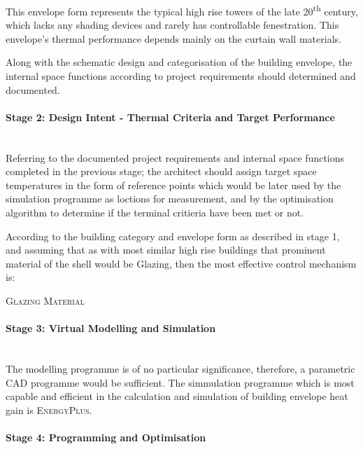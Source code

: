 This envelope form represents the typical high rise towers of the late 20\textsuperscript{th} century, which lacks any shading devices and rarely has controllable fenestration. This envelope's thermal performance depends mainly on the curtain wall materials.

Along with the schematic design and categorisation of the building envelope, the internal space functions according to project requirements should determined and documented.

\paragraph{Stage 2: Design Intent - Thermal Criteria and Target Performance}\mbox{}\\

Referring to the documented project requirements and internal space functions completed in the previous stage; the architect should assign target space temperatures in the form of reference points which would be later used by the simulation programme as loctions for measurement, and by the optimisation algorithm to determine if the terminal critieria have been met or not.

According to the building category and envelope form as described in stage 1, and assuming that as with most similar high rise buildings that prominent material of the shell would be Glazing, then the most effective control mechanism is: 

\begin{compactenum}
	\item \textsc{Glazing Material}
\end{compactenum}

\paragraph{Stage 3: Virtual Modelling and Simulation}\mbox{}\\

The modelling programme is of no particular significance, therefore, a parametric CAD programme would be sufficient. The simmulation programme which is most capable and efficient in the calculation and simulation of building envelope heat gain is \textsc{EnergyPlus}.

\paragraph{Stage 4: Programming and Optimisation}\mbox{}\\

